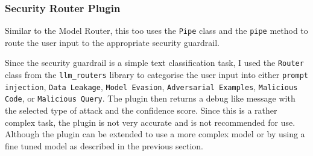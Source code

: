 \subsubsection{Security Router Plugin}

Similar to the Model Router, this too uses the \texttt{Pipe} class and the \texttt{pipe} method to route the user input to the appropriate security guardrail.

Since the security guardrail is a simple text classification task, I used the \texttt{Router} class from the \texttt{llm\_routers} library to categorise the user input into either \texttt{prompt injection}, \texttt{Data Leakage}, \texttt{Model Evasion}, \texttt{Adversarial Examples}, \texttt{Malicious Code}, or \texttt{Malicious Query}. The plugin then returns a debug like message with the selected type of attack and the confidence score. Since this is a rather complex task, the plugin is not very accurate and is not recommended for use. Although the plugin can be extended to use a more complex model or by using a fine tuned model as described in the previous section.

